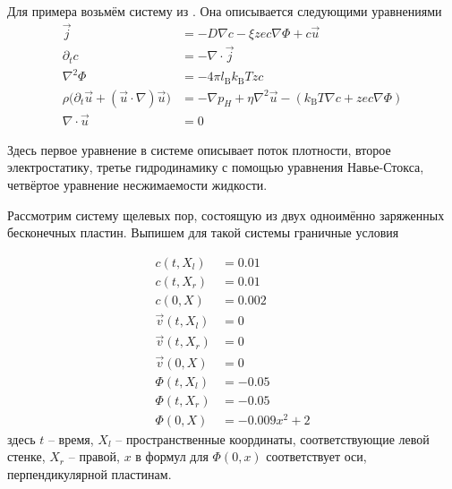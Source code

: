 \documentclass[a4paper,14pt]{extarticle} %
\def\oldcite{} \let\oldcite=\cite
\def\cite{\stepcounter{citesnum}\oldcite}
\begin{document}
Для примера возьмём систему из \cite{bib:tutor}. Она описывается следующими уравнениями
$$\begin{aligned}
        \vec{j}                                                               & =
        -D \nabla c - \xi z e c \nabla \Phi + c \vec{u}                                    \\
        \partial_{t} c                                                        & =
        -\nabla \cdot\vec{j}                                                               \\
        \nabla^2 \Phi                                                         & =
        -4 \pi l_\mathrm{B} k_\mathrm{B}T z c                                              \\
        \rho \big( \partial_t \vec{u} + (\vec{u} \cdot \nabla ) \vec{u} \big) & =
        -\nabla p_H + \eta \nabla^{2} \vec{u} - (k_\mathrm{B}T \nabla c + zec \nabla \Phi) \\
        \nabla \cdot \vec{u}                                                  & =
        0
    \end{aligned}$$

Здесь первое уравнение в системе описывает поток плотности, второе электростатику, третье гидродинамику с помощью уравнения Навье-Стокса, четвёртое уравнение несжимаемости жидкости.

Рассмотрим систему щелевых пор, состоящую из двух одноимённо заряженных бесконечных пластин. Выпишем для такой системы граничные условия

$$
    \begin{aligned}
        c(t, X_l)       & = 0.01        \\
        c(t, X_r)       & = 0.01        \\
        c(0, X)         & = 0.002       \\
        \vec{v}(t, X_l) & = 0           \\
        \vec{v}(t, X_r) & = 0           \\
        \vec{v}(0, X)   & = 0           \\
        \Phi(t, X_l)    & = -0.05       \\
        \Phi(t, X_r)    & = -0.05       \\
        \Phi(0, X)      & = -0.009x^2+2
    \end{aligned}
$$
здесь $t$ -- время, $X_l$ -- пространственные координаты, соответствующие левой стенке, $X_r$ -- правой, $x$ в формул для $\Phi(0,x)$ соответствует оси, перпендикулярной пластинам.
\end{document}
